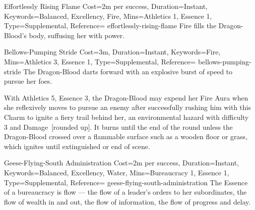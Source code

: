 

\begin{Charm}{Effortlessly Rising Flame}{%
    Cost=2m per success,
    Duration=Instant,
    Keywords={Balanced, Excellency, Fire},
    Mins={Athletics 1, Essence 1},
    Type=Supplemental,
    Reference=\cite*[p.~168]{db}
}{effortlessly-rising-flame}
    Fire fills the Dragon-Blood's body, suffusing her with power. 
\end{Charm}


\begin{Charm}{Bellows-Pumping Stride}{%
    Cost=3m,
    Duration=Instant,
    Keywords=Fire,
    Mins={Athletics 3, Essence 1},
    Type=Supplemental,
    Reference=\cite*[p.~168]{db}
}{bellows-pumping-stride}
    The Dragon-Blood darts forward with an explosive burst of speed to pursue her
    foes. 

    \begin{Unavailable}
        With Athletics 5, Essence 3, the Dragon-Blood may expend her Fire Aura when
        she reflexively moves to pursue an enemy after successfully rushing him with
        this Charm to ignite a fiery trail behind her, an environmental hazard with
        difficulty 3 and Damage~[rounded up]. It burns
        until the end of the round unless the Dragon-Blood crossed over a flammable
        surface such as a wooden floor or grass, which ignites until extinguished or
        end of scene.
    \end{Unavailable}
\end{Charm}



\DocumentColumnBreak
{}

\begin{Charm}{Geese-Flying-South Administration}{%
    Cost=2m per success,
    Duration=Instant,
    Keywords={Balanced, Excellency, Water},
    Mins={Bureaucracy 1, Essence 1},
    Type=Supplemental,
    Reference=\cite*[p.~181]{db}
}{geese-flying-south-administration}
    The Essence of a bureaucracy is flow --- the flow of a leader's orders to her
    subordinates, the flow of wealth in and out, the flow of information, the flow
    of progress and delay. 
\end{Charm}


